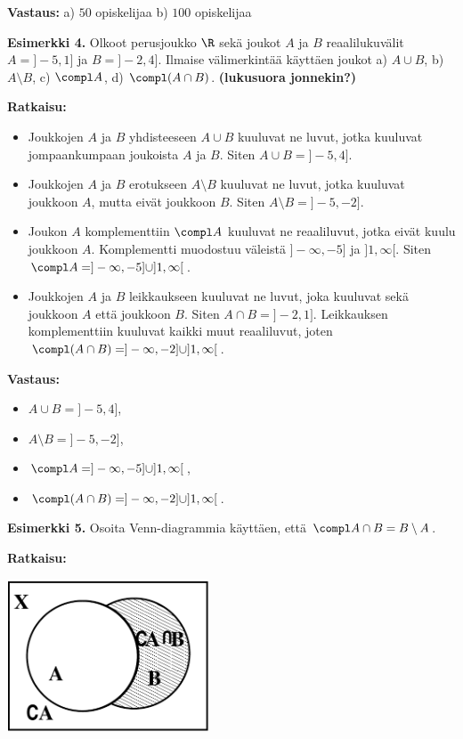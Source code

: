 {\bf Vastaus:} a) $50$ opiskelijaa b) $100$ opiskelijaa


{\bf Esimerkki 4.} Olkoot perusjoukko $\R$ sekä joukot $A$ ja $B$ reaalilukuvälit $A = ]-5, 1]$ ja $B = ]-2, 4]$. Ilmaise välimerkintää käyttäen joukot a) $A\cup B$, b) $A \setminus B$, c) $\compl A$, d) $\compl( A \cap B)$. {\bf (lukusuora jonnekin?)}  

{\bf Ratkaisu:} 
\begin{itemize}
\item[a)] Joukkojen $A$ ja $B$ yhdisteeseen $A \cup B$ kuuluvat ne luvut, jotka kuuluvat jompaankumpaan joukoista $A$ ja $B$. Siten $A\cup B = ]-5, 4]$.
\item[b)] Joukkojen $A$ ja $B$ erotukseen $A \setminus B$ kuuluvat ne luvut, jotka kuuluvat joukkoon $A$, mutta eivät joukkoon $B$. Siten $A \setminus B = ]-5, -2]$.
\item[c)] Joukon $A$ komplementtiin $\compl A$ kuuluvat ne reaaliluvut, jotka eivät kuulu joukkoon $A$. Komplementti muodostuu väleistä $]-\infty, -5]$ ja $]1, \infty [$. Siten $\compl A = ]-\infty, -5] \cup ]1, \infty [$.
\item[d)] Joukkojen $A$ ja $B$ leikkaukseen kuuluvat ne luvut, joka kuuluvat sekä joukkoon $A$ että joukkoon $B$. Siten $A\cap B = ]-2, 1]$. Leikkauksen komplementtiin kuuluvat kaikki muut reaaliluvut, joten $\compl( A \cap B) = ]-\infty, -2] \cup ]1,\infty [$.
\end{itemize}

{\bf Vastaus:}
\begin{itemize}
\item[a)] $A\cup B =]-5, 4]$,
\item[b)] $A \setminus B = ]-5, -2]$,
\item[c)] $\compl A = ]-\infty, -5] \cup ]1, \infty [$,
\item[d)] $\compl( A \cap B) = ]-\infty, -2] \cup ]1,\infty [$.
\end{itemize}


{\bf Esimerkki 5.} Osoita Venn-diagrammia käyttäen, että $\compl A \cap B = B \setminus A$.

{\bf Ratkaisu:}


\begin{center}
\includegraphics[width=6cm]{kuvat/esim4-3_2b}
\end{center}

